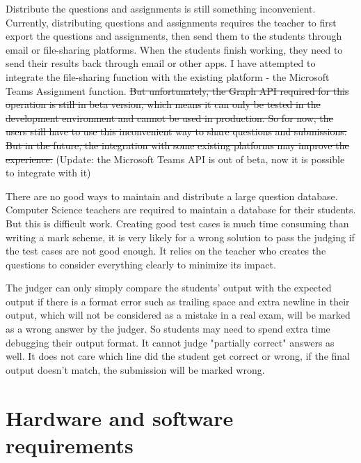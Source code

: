 \documentclass[a4paper]{report}
\begin{document}
Distribute the questions and assignments is still something inconvenient. Currently, distributing questions and assignments requires the teacher to first export the questions and assignments, then send them to the students through email or file-sharing platforms. When the students finish working, they need to send their results back through email or other apps. I have attempted to integrate the file-sharing function with the existing platform - the Microsoft Teams Assignment function. \sout{But unfortunately, the Graph API required for this operation is still in beta version, which means it can only be tested in the development environment and cannot be used in production. So for now, the users still have to use this inconvenient way to share questions and submissions. But in the future, the integration with some existing platforms may improve the experience.} (Update: the Microsoft Teams API is out of beta, now it is possible to integrate with it)

There are no good ways to maintain and distribute a large question database. Computer Science teachers are required to maintain a database for their students. But this is difficult work. Creating good test cases is much time consuming than writing a mark scheme, it is very likely for a wrong solution to pass the judging if the test cases are not good enough. It relies on the teacher who creates the questions to consider everything clearly to minimize its impact.

The judger can only simply compare the students' output with the expected output if there is a format error such as trailing space and extra newline in their output, which will not be considered as a mistake in a real exam, will be marked as a wrong answer by the judger. So students may need to spend extra time debugging their output format. It cannot judge "partially correct" answers as well. It does not care which line did the student get correct or wrong, if the final output doesn't match, the submission will be marked wrong. 

\section{Hardware and software requirements}
\end{document}
